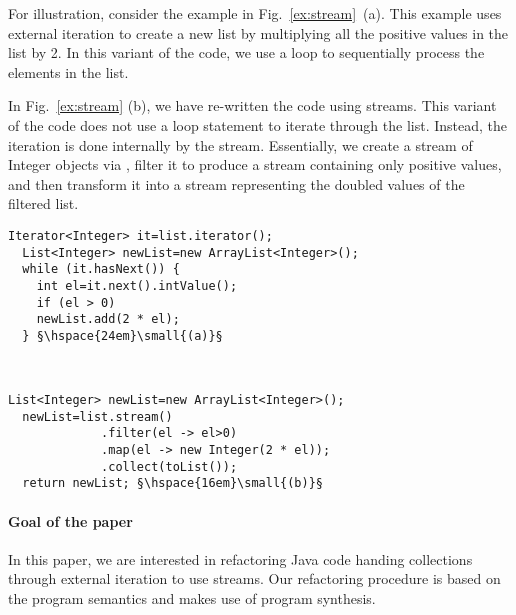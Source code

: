 \documentclass[runningheads,a4paper]{llncs}
\begin{document}
For illustration, consider the example in Fig.~\ref{ex:stream}~(a). 
This example uses external iteration to create a new list by multiplying
all the positive values in the list  by 2.  In this variant of the
code, we use a  loop to sequentially process the elements in the
list.

In Fig.~\ref{ex:stream} (b), we have re-written the code using streams. 
This variant of the code does not use a loop statement to iterate through the
list.  Instead, the iteration is done internally by the stream.  Essentially, we
create a stream of Integer objects via , filter it
to produce a stream containing only positive values, and then transform it
into a stream representing the doubled values of the filtered list.

\begin{figure*}
\begin{minipage}{\textwidth}
  \begin{lstlisting}[mathescape=true,escapechar={§}]
  Iterator<Integer> it=list.iterator();
  List<Integer> newList=new ArrayList<Integer>();
  while (it.hasNext()) {
    int el=it.next().intValue();
    if (el > 0)
	newList.add(2 * el);
  } §\hspace{24em}\small{(a)}§
\end{lstlisting}
\end{minipage}\\
\begin{minipage}{\textwidth}
  \begin{lstlisting}[mathescape=true,escapechar={§}]
  List<Integer> newList=new ArrayList<Integer>();
  newList=list.stream()
             .filter(el -> el>0)
             .map(el -> new Integer(2 * el));
             .collect(toList());
  return newList; §\hspace{16em}\small{(b)}§
\end{lstlisting}
\end{minipage}
\caption{Filtering and mapping example with external (a) vs. internal (b) iteration.}
\label{ex:stream}
\end{figure*}

\paragraph{Goal of the paper} 
In this paper, we are interested in refactoring Java code handing
collections through external iteration to use streams. Our refactoring
procedure is based on the program semantics and makes use of program
synthesis.
\end{document}
